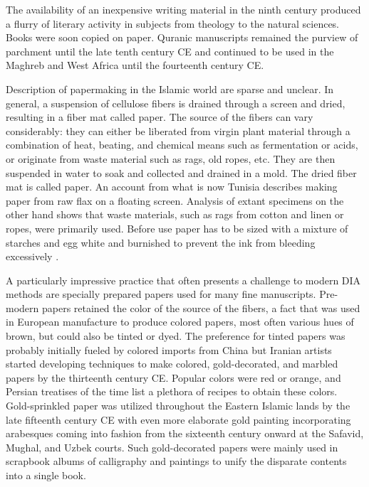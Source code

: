 The availability of an inexpensive writing material in the ninth century
produced a flurry of literary activity in subjects from theology to the natural
sciences. Books were soon copied on paper. Quranic manuscripts remained the
purview of parchment until the late tenth century CE and continued to be used
in the Maghreb and West Africa until the fourteenth century CE.

Description of papermaking in the Islamic world are sparse and unclear. In
general, a suspension of cellulose fibers is drained through a screen and
dried, resulting in a fiber mat called paper. The source of the fibers can vary
considerably: they can either be liberated from virgin plant material through a
combination of heat, beating, and chemical means such as fermentation or acids,
or originate from waste material such as rags, old ropes, etc. They are then
suspended in water to soak and collected and drained in a mold. The dried fiber
mat is called paper. An account from what is now Tunisia describes making paper
from raw flax on a floating screen. Analysis of extant specimens on the other
hand shows that waste materials, such as rags from cotton and linen or ropes,
were primarily used. Before use paper has to be sized with a mixture of
starches and egg white and burnished to prevent the ink from bleeding
excessively \cite[pg. 44-45]{bloompaper}.

A particularly impressive practice that often presents a challenge to modern
DIA methods are specially prepared papers used for many fine manuscripts.
Pre-modern papers retained the color of the source of the fibers, a fact that
was used in European manufacture to produce colored papers, most often various
hues of brown, but could also be tinted or dyed. The preference for tinted
papers was probably initially fueled by colored imports from China but Iranian
artists started developing techniques to make colored, gold-decorated, and
marbled papers by the thirteenth century CE. Popular colors were red or orange,
and Persian treatises of the time list a plethora of recipes to obtain these
colors. Gold-sprinkled paper was utilized throughout the Eastern Islamic lands
by the late fifteenth century CE with even more elaborate gold painting
incorporating arabesques coming into fashion from the sixteenth century onward
at the Safavid, Mughal, and Uzbek courts. Such gold-decorated papers were
mainly used in scrapbook albums of calligraphy and paintings to unify the
disparate contents into a single book.

